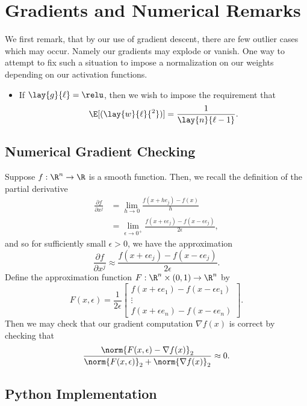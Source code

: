 

\section{Gradients and Numerical Remarks}

We first remark, that by our use of gradient descent, there are few outlier cases which may occur.  Namely our gradients may explode or vanish.  One way to attempt to fix such a situation to impose a normalization on our weights depending on our activation functions.
\begin{itemize}
	\item If $\lay{g}{\ell}=\relu$, then we wish to impose the requirement that
		$$\E[(\lay{w}{\ell}{^2})]=\frac{1}{\lay{n}{\ell-1}}.$$
\end{itemize}


\subsection{Numerical Gradient Checking}

Suppose $f:\R^n\to\R$ is a smooth function.  Then, we recall the definition of the partial derivative
\begin{align*}
	\frac{\partial f}{\partial x^j}&=\lim_{h\to0}\frac{f(x+he_j)-f(x)}{h}\\
	&=\lim_{\epsilon\to0^+}\frac{f(x+\epsilon e_j)-f(x-\epsilon e_j)}{2\epsilon},
\end{align*}
and so for sufficiently small $\epsilon>0$, we have the approximation
$$\frac{\partial f}{\partial x^j}\approx \frac{f(x+\epsilon e_j)-f(x-\epsilon e_j)}{2\epsilon}.$$
Define the approximation function $F:\R^n\times (0,1)\to\R^n$ by
$$F(x,\epsilon)=\frac{1}{2\epsilon}\begin{bmatrix}
	f(x+\epsilon e_1)-f(x-\epsilon e_1)\\
	\vdots\\
	f(x+\epsilon e_n)-f(x-\epsilon e_n)
\end{bmatrix}.$$
Then we may check that our gradient computation $\nabla f(x)$ is correct by checking that
$$\frac{\norm{F(x,\epsilon)-\nabla f(x)}_2}{\norm{F(x,\epsilon)}_2+\norm{\nabla f(x)}_2}\approx 0.$$

\subsection{Python Implementation}

